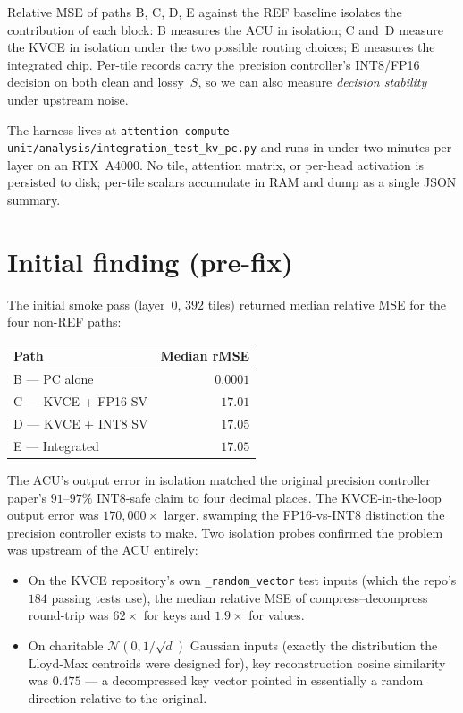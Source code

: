 \documentclass[11pt]{article}
\begin{document}
Relative MSE of paths B, C, D, E against the REF baseline isolates
the contribution of each block: B measures the ACU in isolation;
C and~D measure the KVCE in isolation under the two possible routing
choices; E measures the integrated chip. Per-tile records carry
the precision controller's INT8/FP16 decision on both clean and
lossy~$S$, so we can also measure \emph{decision stability}
under upstream noise.

The harness lives at
\texttt{attention-compute-unit/analysis/integration\_test\_kv\_pc.py}
and runs in under two minutes per layer on an RTX~A4000. No tile,
attention matrix, or per-head activation is persisted to disk; per-tile
scalars accumulate in RAM and dump as a single JSON summary.

\section{Initial finding (pre-fix)}
\label{sec:initial}

The initial smoke pass (layer~0, $392$ tiles) returned median
relative MSE for the four non-REF paths:

\begin{center}
\begin{tabular}{@{}lr@{}}
\toprule
Path & Median rMSE \\
\midrule
B --- PC alone & $0.0001$ \\
C --- KVCE + FP16 SV & $17.01$ \\
D --- KVCE + INT8 SV & $17.05$ \\
E --- Integrated & $17.05$ \\
\bottomrule
\end{tabular}
\end{center}

The ACU's output error in isolation matched the original precision
controller paper's $91$--$97\%$ INT8-safe claim to four decimal
places. The KVCE-in-the-loop output error was $170{,}000\times$
larger, swamping the FP16-vs-INT8 distinction the precision
controller exists to make. Two isolation probes confirmed the
problem was upstream of the ACU entirely:

\begin{itemize}
\item On the KVCE repository's own \texttt{\_random\_vector} test
      inputs (which the repo's $184$ passing tests use), the median
      relative MSE of compress--decompress round-trip was $62\times$
      for keys and $1.9\times$ for values.
\item On charitable $\mathcal{N}(0, 1/\sqrt{d})$ Gaussian inputs
      (exactly the distribution the Lloyd-Max centroids were
      designed for), key reconstruction cosine similarity was
      $0.475$ --- a decompressed key vector pointed in essentially
      a random direction relative to the original.
\end{itemize}
\end{document}
